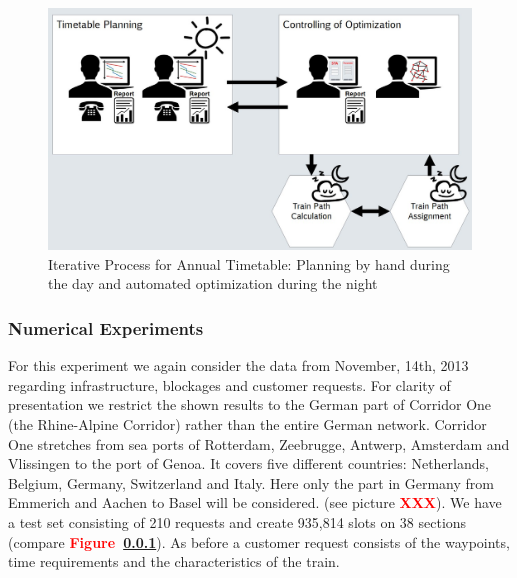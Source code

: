 \begin{figure}[htb]
	\centering
	\includegraphics[width=\textwidth]{Bilder/annual_planning.jpg}
	\caption{Iterative Process for Annual Timetable: Planning by hand during the day and automated optimization during the night}
	\label{fig:annual_planning}
\end{figure}

\subsubsection{Numerical Experiments}
For this experiment we again consider the data from November, 14th, 2013 regarding infrastructure, blockages and customer requests. For clarity of presentation we restrict the shown results to the German part of Corridor One (the Rhine-Alpine Corridor) \cite{} rather than the entire German network. Corridor One stretches from sea ports of Rotterdam, Zeebrugge, Antwerp, Amsterdam and Vlissingen to the port of Genoa. It covers five different countries: Netherlands, Belgium, Germany, Switzerland and Italy. Here only the part in Germany from Emmerich and Aachen to Basel will be considered. (see picture \textbf{\textcolor{red}{XXX}}). We have a test set consisting of 210 requests and create 935,814 slots on 38 sections (compare \textbf{\textcolor{red}{Figure~\ref{}}}).
As before a customer request consists of the waypoints, time requirements and the characteristics of the train.


